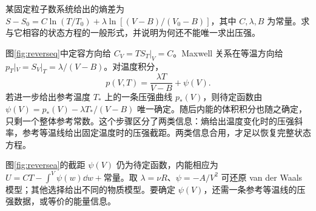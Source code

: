 \begingroup
\setlength{\intextsep}{3pt}\setlength{\abovecaptionskip}{4pt}
\begin{exercise}[通过熵函数反推状态方程]
某固定粒子数系统给出的熵差为 $S-S_0=C\ln(T/T_0)+\lambda\ln[(V-B)/(V_0-B)]$，其中 $C,\lambda,B$ 为常量。求与它相容的状态方程的一般形式，并说明为何还不能唯一求出压强。
\end{exercise}
\begin{solution}
图\ref{fig:reverseq}中定容方向给 $C_V=TS_T|_V=C$。Maxwell 关系在等温方向给 $p_T|_V=S_V|_T=\lambda/(V-B)$。对温度积分，
\[
 p(V,T)=\frac{\lambda T}{V-B}+\psi(V).
\]
若进一步给出参考温度 $T_*$ 上的一条压强曲线 $p_*(V)$，则待定函数由 $\psi(V)=p_*(V)-\lambda T_* /(V-B)$ 唯一确定。随后内能的体积积分也随之确定，只剩一个整体参考常数。这个步骤区分了两类信息：熵给出温度变化时的压强斜率，参考等温线给出固定温度时的压强截距。两类信息合用，才足以恢复完整状态方程。

图\ref{fig:reversea}的截距 $\psi(V)$ 仍为待定函数，内能相应为 $U=CT-\int^V\psi(w)\dd w+\text{常量}$。取 $\lambda=\nu R$、$\psi=-A/V^2$ 可还原 van der Waals 模型；其他选择给出不同的物质模型。要确定 $\psi(V)$，还需一条参考等温线的压强数据，或等价的能量信息。
\end{solution}
\endgroup
